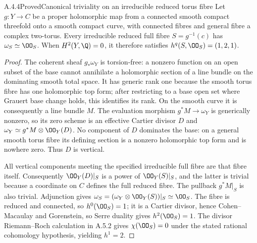 \begin{statement}{A.4.4}{Proved}{Canonical triviality on an irreducible reduced torus fibre}
Let $g:Y\to C$ be a proper holomorphic map from a connected smooth compact threefold onto a smooth compact curve, with connected fibres and general fibre a complex two-torus. Every irreducible reduced full fibre $S=g^{-1}(c)$ has $\omega_S\simeq\OO_S$. When $H^2(Y,\Q)=0$, it therefore satisfies $h^q(S,\OO_S)=(1,2,1)$.
\end{statement}
\begin{proof}
The coherent sheaf $g_*\omega_Y$ is torsion-free: a nonzero function on an open subset of the base cannot annihilate a holomorphic section of a line bundle on the dominating smooth total space. It has generic rank one because the smooth torus fibre has one holomorphic top form; after restricting to a base open set where Grauert base change holds, this identifies its rank. On the smooth curve it is consequently a line bundle $M$. The evaluation morphism $g^*M\to\omega_Y$ is generically nonzero, so its zero scheme is an effective Cartier divisor $D$ and $\omega_Y\simeq g^*M\otimes\OO_Y(D)$. No component of $D$ dominates the base: on a general smooth torus fibre its defining section is a nonzero holomorphic top form and is nowhere zero. Thus $D$ is vertical.

All vertical components meeting the specified irreducible full fibre are that fibre itself. Consequently $\OO_Y(D)|_S$ is a power of $\OO_Y(S)|_S$, and the latter is trivial because a coordinate on $C$ defines the full reduced fibre. The pullback $g^*M|_S$ is also trivial. Adjunction gives $\omega_S=(\omega_Y\otimes\OO_Y(S))|_S\simeq\OO_S$. The fibre is reduced and connected, so $h^0(\OO_S)=1$; it is a Cartier divisor, hence Cohen--Macaulay and Gorenstein, so Serre duality gives $h^2(\OO_S)=1$. The divisor Riemann--Roch calculation in A.5.2 gives $\chi(\OO_S)=0$ under the stated rational cohomology hypothesis, yielding $h^1=2$.
\end{proof}

